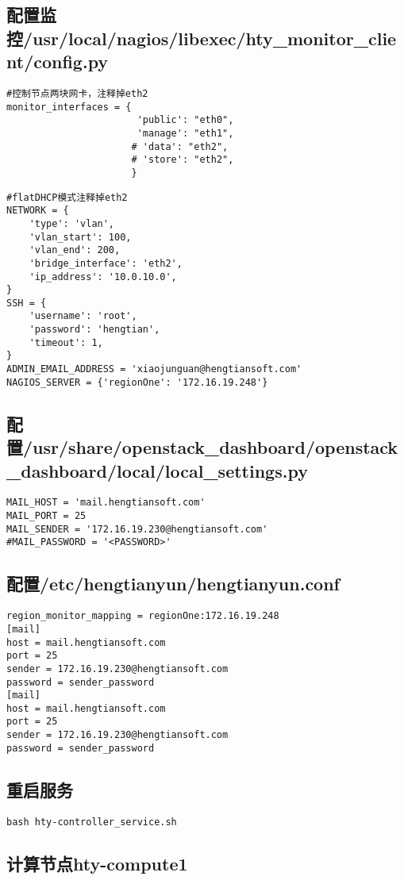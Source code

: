 \documentclass[a4paper,left=1.5cm,right=1.5cm,11pt]{article}
\begin{document}
\subsection{配置监控/usr/local/nagios/libexec/hty_monitor_client/config.py}
\begin{lstlisting}
#控制节点两块网卡，注释掉eth2
monitor_interfaces = {
                       'public': "eth0",
                       'manage': "eth1",
                      # 'data': "eth2",
                      # 'store': "eth2",
                      }
\end{lstlisting}
\begin{lstlisting}
#flatDHCP模式注释掉eth2
NETWORK = {
    'type': 'vlan',
    'vlan_start': 100,
    'vlan_end': 200,
    'bridge_interface': 'eth2',
    'ip_address': '10.0.10.0',
}
SSH = {
    'username': 'root',
    'password': 'hengtian',
    'timeout': 1,
}
ADMIN_EMAIL_ADDRESS = 'xiaojunguan@hengtiansoft.com'
NAGIOS_SERVER = {'regionOne': '172.16.19.248'}
\end{lstlisting}
\subsection{配置/usr/share/openstack_dashboard/openstack_dashboard/local/local_settings.py}
\begin{lstlisting}
MAIL_HOST = 'mail.hengtiansoft.com'
MAIL_PORT = 25
MAIL_SENDER = '172.16.19.230@hengtiansoft.com'
#MAIL_PASSWORD = '<PASSWORD>'
\end{lstlisting}
\subsection{配置/etc/hengtianyun/hengtianyun.conf}
\begin{lstlisting}
region_monitor_mapping = regionOne:172.16.19.248
[mail]
host = mail.hengtiansoft.com
port = 25
sender = 172.16.19.230@hengtiansoft.com
password = sender_password
[mail]
host = mail.hengtiansoft.com
port = 25
sender = 172.16.19.230@hengtiansoft.com
password = sender_password
\end{lstlisting}
\subsection{重启服务}
\begin{lstlisting}
bash hty-controller_service.sh
\end{lstlisting}
\subsection{计算节点hty-compute1}
\end{document}
